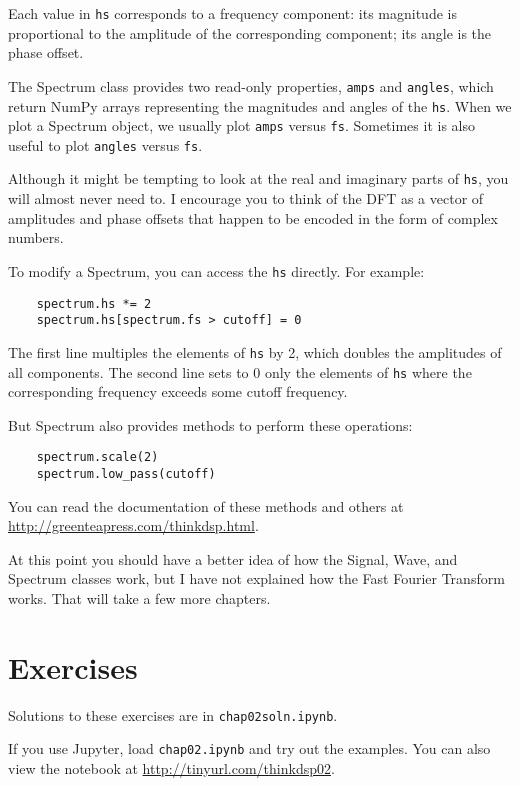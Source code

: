 Each value in {\tt hs} corresponds to a frequency component: its
magnitude is proportional to the amplitude of the corresponding
component; its angle is the phase offset.

The Spectrum class provides two read-only properties, {\tt amps}
and {\tt angles}, which return NumPy arrays representing the
magnitudes and angles of the {\tt hs}.  When we plot a Spectrum
object, we usually plot {\tt amps} versus {\tt fs}.  Sometimes
it is also useful to plot {\tt angles} versus {\tt fs}.

Although it might be tempting to look at the real and imaginary
parts of {\tt hs}, you will almost never need to.  I encourage
you to think of the DFT as a vector of amplitudes and phase offsets
that happen to be encoded in the form of complex numbers.

To modify a Spectrum, you can access the {\tt hs} directly.
For example:

\begin{verbatim}
	spectrum.hs *= 2
	spectrum.hs[spectrum.fs > cutoff] = 0
\end{verbatim}

The first line multiples the elements of {\tt hs} by 2, which
doubles the amplitudes of all components.  The second line
sets to 0 only the elements of {\tt hs} where the corresponding
frequency exceeds some cutoff frequency.

But Spectrum also provides methods to perform these operations:

\begin{verbatim}
	spectrum.scale(2)
	spectrum.low_pass(cutoff)
\end{verbatim}

You can read the documentation of these methods and others at
\url{http://greenteapress.com/thinkdsp.html}.

At this point you should have a better idea of how the Signal, Wave,
and Spectrum classes work, but I have not explained how the Fast
Fourier Transform works.  That will take a few more chapters.


\section{Exercises}

Solutions to these exercises are in {\tt chap02soln.ipynb}.

\begin{exercise}
	If you use Jupyter, load {\tt chap02.ipynb} and try out the examples.
	You can also view the notebook at \url{http://tinyurl.com/thinkdsp02}.
\end{exercise}


